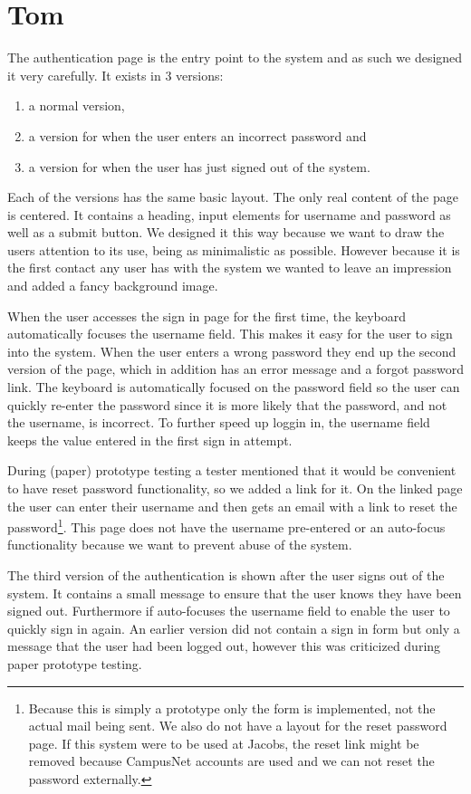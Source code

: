 \section{Tom}

The authentication page is the entry point to the system and as such we designed it very carefully. It exists in 3 versions:

\begin{enumerate}
  \item a normal version,
  \item a version for when the user enters an incorrect password and
  \item a version for when the user has just signed out of the system.
\end{enumerate}

Each of the versions has the same basic layout. The only real content of the page is centered. It contains a heading, input elements for username and password as well as a submit button. We designed it this way because we want to draw the users attention to its use, being as minimalistic as possible. However because it is the first contact any user has with the system we wanted to leave an impression and added a fancy background image.

When the user accesses the sign in page for the first time, the keyboard automatically focuses the username field. This makes it easy for the user to sign into the system. When the user enters a wrong password they end up the second version of the page, which in addition has an error message and a forgot password link. The keyboard is automatically focused on the password field so the user can quickly re-enter the password since it is more likely that the password, and not the username, is incorrect. To further speed up loggin in, the username field keeps the value entered in the first sign in attempt.

During (paper) prototype testing a tester mentioned that it would be convenient to have reset password functionality, so we added a link for it.  On the linked page the user can enter their username and then gets an email with a link to reset the password\footnote{Because this is simply a prototype only the form is implemented, not the actual mail being sent. We also do not have a layout for the reset password page. If this system were to be used at Jacobs, the reset link might be removed because CampusNet accounts are used and we can not reset the password externally. }. This page does not have the username pre-entered or an auto-focus functionality because we want to prevent abuse of the system.

The third version of the authentication is shown after the user signs out of the system. It contains a small message to ensure that the user knows they have been signed out. Furthermore if auto-focuses the username field to enable the user to quickly sign in again. An earlier version did not contain a sign in form but only a message that the user had been logged out, however this was criticized during paper prototype testing. 
